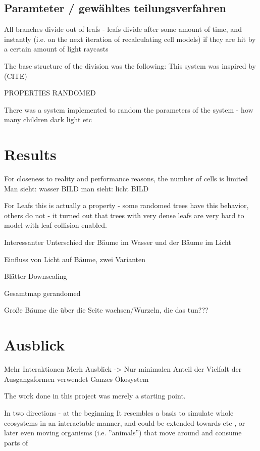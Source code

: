 \documentclass[11pt]{scrartcl}
\begin{document}
\subsection{Paramteter / gewähltes teilungsverfahren}
All branches divide out of leafs - leafs divide after some amount of time, and instantly (i.e. on the next iteration of recalculating cell models) if they are hit by a certain amount of light raycasts  

The base structure of the division was the following: 
This system was inspired by (CITE)

PROPERTIES RANDOMED

There was a system implemented to random the parameters of the system - how many children
dark
light
etc


\section{Results}



For closeness to reality and performance reasons, the number of cells is limited
Man sieht: wasser BILD
man sieht: licht BILD

For Leafs this is actually a property - some randomed trees have this behavior, others do not - it turned out that trees with very dense leafs are very hard to model with leaf collision enabled.

Interessanter Unterschied der Bäume im Wasser und der Bäume im Licht

Einfluss von Licht auf Bäume, zwei Varianten

Blätter Downscaling

Gesamtmap gerandomed

Große Bäume die über die Seite wachsen/Wurzeln, die das tun???

\section{Ausblick}
Mehr Interaktionen
Merh Ausblick -> Nur minimalen Anteil der Vielfalt der Ausgangsformen verwendet
Ganzes Ökosystem

The work done in this project was merely a starting point.

In two directions - at the beginning
It resembles a basis to simulate whole ecosystems in an interactable manner, and could be extended towards  etc , or later even moving organisms (i.e. ''animals'') that move around and consume parts of 
\end{document}
